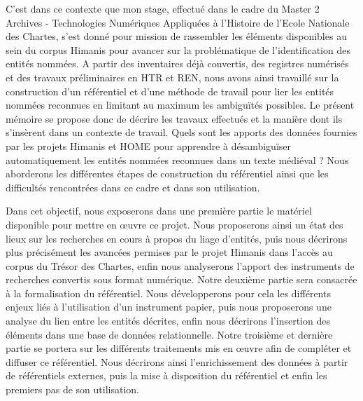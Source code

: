 \documentclass[a4paper,12pt,twoside]{book}
\makeatletter
\newcommand{\parttext}[1]{\def\@parttext{#1}}
\makeatother
\begin{document}
	C'est dans ce contexte que mon stage, effectué dans le cadre du Master 2 Archives - Technologies Numériques Appliquées à l'Histoire de l'Ecole Nationale des Chartes, s'est donné pour mission de rassembler les éléments disponibles au sein du corpus Himanis pour avancer sur la problématique de l'identification des entités nommées. A partir des inventaires déjà convertis, des registres numérisés et des travaux préliminaires en HTR et REN, nous avons ainsi travaillé sur la construction d'un référentiel et d'une méthode de travail pour lier les entités nommées reconnues en limitant au maximum les ambiguïtés possibles. Le présent mémoire se propose donc de décrire les travaux effectués et la manière dont ils s'insèrent dans un contexte de travail. Quels sont les apports des données fournies par les projets Himanis et HOME pour apprendre à désambiguïser automatiquement les entités nommées reconnues dans un texte médiéval ? Nous aborderons les différentes étapes de construction du référentiel ainsi que les difficultés rencontrées dans ce cadre et dans son utilisation.
	
	Dans cet objectif, nous exposerons dans une première partie le matériel disponible pour mettre en œuvre ce projet. Nous proposerons ainsi un état des lieux sur les recherches en cours à propos du liage d'entités, puis nous décrirons plus précisément les avancées permises par le projet Himanis dans l'accès au corpus du Trésor des Chartes, enfin nous analyserons l'apport des instruments de recherches convertis sous format numérique. Notre deuxième partie sera consacrée à la formalisation du référentiel. Nous développerons pour cela les différents enjeux liés à l'utilisation d'un instrument papier, puis nous proposerons une analyse du lien entre les entités décrites, enfin nous décrirons l'insertion des éléments dans une base de données relationnelle. Notre troisième et dernière partie se portera sur les différents traitements mis en œuvre afin de compléter et diffuser ce référentiel. Nous décrirons ainsi l'enrichissement des données à partir de référentiels externes, puis la mise à disposition du référentiel et enfin les premiers pas de son utilisation.
	
	\thispagestyle{empty}
	\cleardoublepage
	
	\mainmatter
	
	\parttext{Avant d'aborder plus précisément les actions menées au cours de ce stage, il convient d'exposer dans cette première partie les différents éléments contextuels dans lequel il s'inscrit. Nous consacrerons donc un premier chapitre à la description des enjeux scientifiques actuels autour de la problématique du liage d'entité afin de mieux appréhender les perspectives d'évolution. Un second chapitre permettra de résumer les différents résultats offerts par le projet Himanis et leur utilisation possible dans le cadre du stage. Enfin, un troisième chapitre permettra d'envisager les différents moyens possibles pour utiliser des instruments de recherches papier afin de construire un référentiel numérique.}
	
\end{document}
